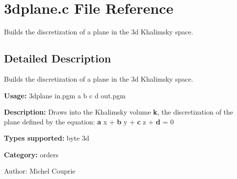 \section{3dplane.c File Reference}
\label{3dplane_8c}
Builds the discretization of a plane in the 3d Khalimsky space.  




\label{_details}
\subsection{Detailed Description}
Builds the discretization of a plane in the 3d Khalimsky space. 

{\bf Usage:} 3dplane in.pgm a b c d out.pgm

{\bf Description:} Draws into the Khalimsky volume {\bf k}, the discretization of the plane defined by the equation: {\bf a} x + {\bf b} y + {\bf c} z + {\bf d} = 0

{\bf Types supported:} byte 3d

{\bf Category:} orders

\begin{Desc}
\item[Author:]Michel Couprie \end{Desc}
